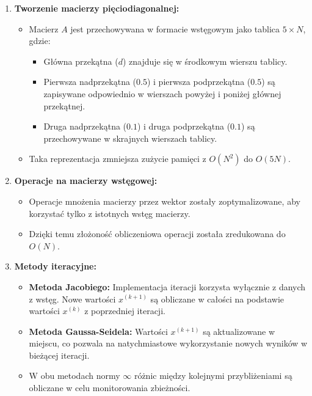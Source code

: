 \documentclass[a4paper,12pt]{article}
\begin{document}
\begin{enumerate}
    \item \textbf{Tworzenie macierzy pięciodiagonalnej:}
    \begin{itemize}
        \item Macierz \(A\) jest przechowywana w formacie wstęgowym jako tablica \(5 \times N\), gdzie:
        \begin{itemize}
            \item Główna przekątna (\(d\)) znajduje się w środkowym wierszu tablicy.
            \item Pierwsza nadprzekątna (\(0.5\)) i pierwsza podprzekątna (\(0.5\)) są zapisywane odpowiednio w wierszach powyżej i poniżej głównej przekątnej.
            \item Druga nadprzekątna (\(0.1\)) i druga podprzekątna (\(0.1\)) są przechowywane w skrajnych wierszach tablicy.
        \end{itemize}
        \item Taka reprezentacja zmniejsza zużycie pamięci z \(O(N^2)\) do \(O(5N)\).
    \end{itemize}
    
    \item \textbf{Operacje na macierzy wstęgowej:}
    \begin{itemize}
        \item Operacje mnożenia macierzy przez wektor zostały zoptymalizowane, aby korzystać tylko z istotnych wstęg macierzy. 
        \item Dzięki temu złożoność obliczeniowa operacji została zredukowana do \(O(N)\).
    \end{itemize}
    
    \item \textbf{Metody iteracyjne:}
    \begin{itemize}
        \item \textbf{Metoda Jacobiego:} Implementacja iteracji korzysta wyłącznie z danych z wstęg. Nowe wartości \(x^{(k+1)}\) są obliczane w całości na podstawie wartości \(x^{(k)}\) z poprzedniej iteracji.
        \item \textbf{Metoda Gaussa-Seidela:} Wartości \(x^{(k+1)}\) są aktualizowane w miejscu, co pozwala na natychmiastowe wykorzystanie nowych wyników w bieżącej iteracji.
        \item W obu metodach normy \( \infty \) różnic między kolejnymi przybliżeniami są obliczane w celu monitorowania zbieżności.
    \end{itemize}
    

\end{enumerate}
\end{document}
